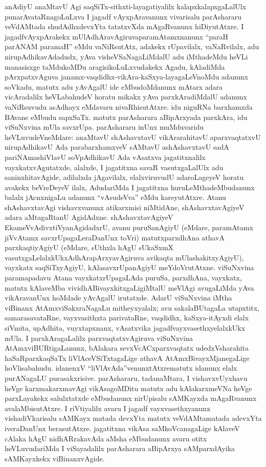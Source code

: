 anAdiyU anaMtavU Agi saqSiTx-sithxti-layagatiyalilx kalapxkalapxgaLalUlx punarA\-vataRnagoLuLxva I jagadf vAyxpAravanunx vivarisalu parAshararu veVdAMtada shudAdhx\-devxYta tatatxvXda mAgaRvanunx hiDiyutAtxre. I jagadfvAyxpArakekx mUlAdhAravAgiruva\break paramAtamxnanunx ``paraH parANAM paramaH'' eMdu vaNiRsutAtx, adakekx rUpavilalx, vaNaR\-vilalx, adu nirupAdhikavAdadudx, yAva visheVSaNagaLiMdalU adu iMthadeMdu heVLi manasisxge taMdukoMDu aragisikoLuLxvudakekx Agadu, kAladiMda pArxpatxvAguva janamx-\-vaqdidhx-vikAra-kaSxya-layagaLeVnoMdu adanunx soVkadu, matutx adu yAvAgalU ide eMbudoMdanunx mAtarx adara vicAradalilx heVLabahudeV horatu mikakx yAva parxkAradiMdalU adanunx vaNiRsuvudu asAdhayx eMdavaru nivaRhisutAtxre. idu niguRNa barxhamxda BAvane eMbudu sapxSaTx. matutx parAsharara aBipArxyada parxkAra, idu viSuNxvina mUla savxrUpa. parAshararu inUnx muMduvaridu heVLuvudeVneMdare: anaMtavU shAshavxtavU vikArarahitavU aparxvaqtatxvU nirupAdhikavU Ada parabarxhamxveV sAMtavU ashAshavxtavU sadA pariNAmashiVlavU soVpAdhikavU Ada vAsatxva jagatitxnalilx vayxkatxvAgutatxde, alalxde, I jagatitxna savaR vasutxgaLalUlx adu saninxhitavAgide, adilalxda jAgavilalx, elalxviruvudU adaroLageyeV horatu avakekx beVreDeyeV ilalx, Aduda\-riMda I jagatitxna huruLeMthadeMbudanunx balalx jAcnxnigaLu adanunx ``vAsudeVva'' eMdu kareyutAtxre. Atanu shAshavxtavAgi vishavxvanunx atikarxmisi niMtidAne, shAshavxtavAgiyeV adara aMtagaRtanU AgidAdxne. shAshavxtavAgiyeV EkameVvAdivxtiVyanAgidadxrU, avanu puruSanAgiyU (eMdare, paramAtamx jiVvAtamx savxrUpagaLeraDanUnx toVri) matutx\break parxdhAna athavA parxkaqtiyAgiyU (eMdare, sUthxla hAgU sUkaSxmX vasutxgaLelalxkUkx\break AdhArapArxyavAgiruva avikaqta mUlashakitxyAgiyU), vayxkatx saqSiTxyAgiyU, kAla\-savxrUpanAgiyU meYdoVrutAtxne. viSuNxvina paramapadavu Atana vayxkatxrUpagaLAda puruSa, parxdhAna, vayxkatx, matutx kAlaveMba vividhABivayxkitxgaLigiMtalU meVlAgi avu\-gaLiMda yAva vikAravanUnx hoMdade yAvAgalU irutatxde. AdarU viSuNx\-vina iMtha viBinanx AtAmxviSakxraNagaLu mitheyxyalalx; avu sakalaBUtagaLa utapxtitx, samarasa\-vataRne, vayxvasithxta parivataRne, vaqdidhx, kaSxya-itAyxdi elalx siVmita, upAdhita, vuyxtapxnanx, vAsatxvika jagadfvayxvasethxyelalxkUkx mUla. I parxkAragaLalilx parxvaqtatxvAgiruva viSuNxvina AtAmxviBURtigaLanunx, bAlakara sevxVcACxparxvaqtatx udedxVsharahita haSaRparxkaqSaTx liVlAceVSiTxta\-gaLige athavA AtAmxBivayxMjanegaLige hoVlisabahudu. idanenxV ``liVlAvAda''venunxtAtxre\break matutx idanunx elalx purANagaLU purasakxrisive. parAshararu, tadanaMtara, I vishavx\-vUyxhavu heVge karxmakarxmavAgi vikAsagoMDitu matutx adu kAlakarxmeVNa heVge parxLayakekx salulxtatxde eMbudanunx nirUpisalu sAMKayxda mAgaRvanunx avalaMbisutAtxre. I riVti\-yalilx avaru I jagadf vayxvasethxyanunx vishadiVkarisalu sAMKayx matada devxYta matutx veVdAMtamatada adevxYta iveraDanUnx berasutAtxre. jagatitxna vikAsa saMkoVcanagaLige kAlaveV cAlaka hAgU nidhARrakavAda aMsha eMbudanunx avaru otitx heVLuvudariMda I viSayadalilx parAsharara aBipArxya sAMparxdAyika sAMKayxkekx viBinanxvAgide.

